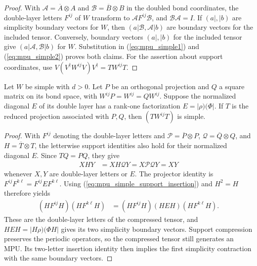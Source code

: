 \begin{proof}\leanok
    With $\mathcal A=\overline A\otimes A$ and
    $\mathcal B=\overline B\otimes B$ in the doubled bond coordinates,
    the double-layer letters $F^{ij}$ of $W$ transform to
    $\mathcal A F^{ij}\mathcal B$, and $\mathcal B\mathcal A=I$.
    If $(a|,|b)$ are simplicity boundary vectors for $W$, then
    $(a|\mathcal B,\mathcal A|b)$ are boundary vectors for the included tensor.
    Conversely, boundary vectors $(a|,|b)$ for the included tensor give
    $(a|\mathcal A,\mathcal B|b)$ for $W$. Substitution in
    (\ref{eq:mpu_simple1}) and (\ref{eq:mpu_simple2}) proves both claims.
    For the assertion about support coordinates, use
    $V(V^\dagger W^{ij}V)V^\dagger=TW^{ij}T$.
\end{proof}

\begin{lemma}
    \label{thm:mpu_simple_reduced_support}
    \leanok
    Let $W$ be simple with $d>0$. Let $P$ be an orthogonal projection and
    $Q$ a square matrix on its bond space, with $W^{ij}P=W^{ij}=QW^{ij}$.
    Suppose the normalized diagonal $E$ of its double layer has a rank-one
    factorization $E=|\rho)(\Phi|$. If $T$ is the reduced projection
    associated with $P,Q$, then $(TW^{ij}T)$ is simple.
\end{lemma}

\begin{proof}\leanok
    With $F^{ij}$ denoting the double-layer letters and
    $\mathcal P=\overline P\otimes P$,
    $\mathcal Q=\overline Q\otimes Q$, and $H=\overline T\otimes T$,
    the letterwise support identities also hold for their normalized diagonal
    $E$. Since $TQ=PQ$, they give
    \begin{align}
        XHY & =XH\mathcal QY=X\mathcal P\mathcal QY=XY
        \label{eq:mpu_simple_support_insertion}
    \end{align}
    whenever $X,Y$ are double-layer letters or $E$.
    The projector identity is $F^{ij}F^{k\ell}=F^{ij}EF^{k\ell}$.
    Using (\ref{eq:mpu_simple_support_insertion}) and $H^2=H$ therefore yields
    \begin{align}
        (HF^{ij}H)(HF^{k\ell}H)
         & =(HF^{ij}H)(HEH)(HF^{k\ell}H).
    \end{align}
    These are the double-layer letters of the compressed tensor, and
    $HEH=|H\rho)(\Phi H|$ gives its two simplicity boundary vectors.
    Support compression preserves the periodic operators, so the compressed
    tensor still generates an MPU. Its two-letter insertion identity then
    implies the first simplicity contraction with the same boundary vectors.
\end{proof}

